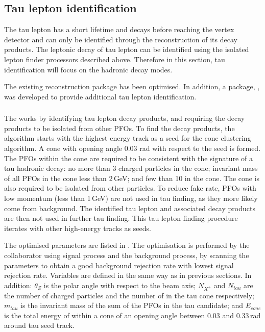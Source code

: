 \subsection{Tau lepton identification}

The tau lepton has a short lifetime and decays before reaching the vertex detector and  can only be identified through the reconstruction of its decay products. The leptonic decay of tau lepton can be identified using the isolated lepton finder processors described above. Therefore in this section, tau identification will focus on the hadronic decay modes.

The existing \TauFinderProcessor  \cite{LCD-Note-2010-009} reconstruction package has been optimised. In addition, a package, \BonoTauFinder, was developed to provide additional tau lepton identification.




\subsubsection{\TauFinderProcessor}

The \TauFinderProcessor works by identifying tau lepton decay products, and requiring the decay products to be isolated from other PFOs. To find the decay products, the algorithm starts with the highest energy track as a seed for the cone clustering algorithm. A cone with opening angle 0.03 rad with respect to the seed is formed. The PFOs within the cone are required to be consistent with the signature of a tau hadronic decay: no more than 3 charged particles in the cone; invariant mass of all PFOs in the cone less than 2\,GeV; and few than 10 \PFOs in the cone. The cone is also required to be isolated from other particles. To reduce fake rate, PFOs with low momentum (less than 1\,GeV) are not used  in tau finding, as they more likely come from \ggHad background. The identified tau lepton and associated decay products are then not used in further tau finding. This tau lepton finding procedure iterates with other high-energy tracks as seeds.


The optimised parameters are listed in . The optimisation is performed by the collaborator using \eeToHHbbbb signal process and the \eeTo{ \Pquark \Pquark \Pquark \Pquark \Plepton \Pnu} background process, by scanning the parameters to obtain a good background rejection rate with lowest signal rejection rate.  Variables are defined in the same way as in previous sections. In addition: $\theta_Z$ is the polar angle with respect to the beam axis; $N_{X^+}$ and $N_{tau}$ are the number of charged particles and the number of \PFOs  in the tau cone respectively; $m_{tau}$ is the invariant mass of the sum of the PFOs in the tau candidate; and $E_{cone}$ is the total energy of \PFOs within a cone of an opening angle between 0.03 and 0.33\,rad  around tau seed track.

